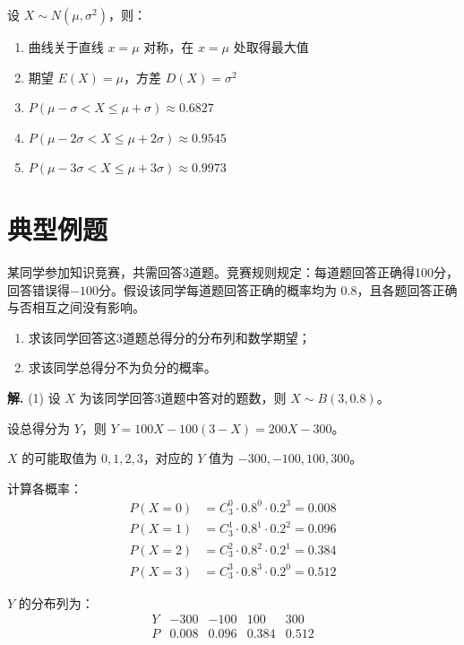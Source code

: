 \documentclass[11pt]{ctexrep}
\begin{document}
\begin{property}[正态分布的性质]
    设 $X \sim N(\mu, \sigma^2)$，则：
    \begin{enumerate}
        \item 曲线关于直线 $x = \mu$ 对称，在 $x = \mu$ 处取得最大值
        \item 期望 $E(X) = \mu$，方差 $D(X) = \sigma^2$
        \item $P(\mu - \sigma < X \le \mu + \sigma) \approx 0.6827$
        \item $P(\mu - 2\sigma < X \le \mu + 2\sigma) \approx 0.9545$
        \item $P(\mu - 3\sigma < X \le \mu + 3\sigma) \approx 0.9973$
    \end{enumerate}
\end{property}

\section*{典型例题}

\begin{example}[分布列与期望计算]
    某同学参加知识竞赛，共需回答3道题。竞赛规则规定：每道题回答正确得100分，回答错误得$-100$分。假设该同学每道题回答正确的概率均为 $0.8$，且各题回答正确与否相互之间没有影响。
    \begin{enumerate}
        \item 求该同学回答这3道题总得分的分布列和数学期望；
        \item 求该同学总得分不为负分的概率。
    \end{enumerate}
\end{example}

\textbf{解.} (1) 设 $X$ 为该同学回答3道题中答对的题数，则 $X \sim B(3, 0.8)$。

设总得分为 $Y$，则 $Y = 100X - 100(3-X) = 200X - 300$。

$X$ 的可能取值为 $0, 1, 2, 3$，对应的 $Y$ 值为 $-300, -100, 100, 300$。

计算各概率：
\begin{align*}
P(X = 0) &= C_3^0 \cdot 0.8^0 \cdot 0.2^3 = 0.008 \\
P(X = 1) &= C_3^1 \cdot 0.8^1 \cdot 0.2^2 = 0.096 \\
P(X = 2) &= C_3^2 \cdot 0.8^2 \cdot 0.2^1 = 0.384 \\
P(X = 3) &= C_3^3 \cdot 0.8^3 \cdot 0.2^0 = 0.512
\end{align*}

$Y$ 的分布列为：
\[
\begin{array}{c|cccc}
Y & -300 & -100 & 100 & 300 \\ \hline
P & 0.008 & 0.096 & 0.384 & 0.512
\end{array}
\]
\end{document}
